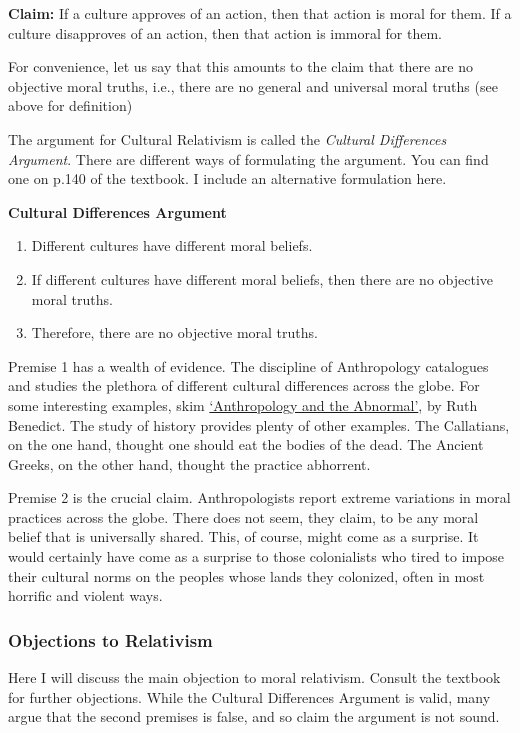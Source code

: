 \documentclass[9pt]{article}
\providecommand{\tightlist}{%
  \setlength{\itemsep}{0pt}\setlength{\parskip}{0pt}}
\begin{document}
\textbf{Claim:} If a culture approves of an action, then that action is
moral for them. If a culture disapproves of an action, then that action
is immoral for them.

For convenience, let us say that this amounts to the claim that there
are no objective moral truths, i.e., there are no general and universal
moral truths (see above for definition)

The argument for Cultural Relativism is called the \emph{Cultural
Differences Argument}. There are different ways of formulating the
argument. You can find one on p.140 of the textbook. I include an
alternative formulation here.

\textbf{Cultural Differences Argument}

\begin{enumerate}
\def\labelenumi{\arabic{enumi}.}
\tightlist
\item
  Different cultures have different moral beliefs.
\item
  If different cultures have different moral beliefs, then there are no
  objective moral truths.
\item
  Therefore, there are no objective moral truths.
\end{enumerate}

Premise 1 has a wealth of evidence. The discipline of Anthropology
catalogues and studies the plethora of different cultural differences
across the globe. For some interesting examples, skim
\href{Benedict.pdf}{`Anthropology and the Abnormal'}, by Ruth Benedict.
The study of history provides plenty of other examples. The Callatians,
on the one hand, thought one should eat the bodies of the dead. The
Ancient Greeks, on the other hand, thought the practice abhorrent.

Premise 2 is the crucial claim. Anthropologists report extreme
variations in moral practices across the globe. There does not seem,
they claim, to be any moral belief that is universally shared. This, of
course, might come as a surprise. It would certainly have come as a
surprise to those colonialists who tired to impose their cultural norms
on the peoples whose lands they colonized, often in most horrific and
violent ways.

\subsubsection{Objections to Relativism}\label{objections-to-relativism}

Here I will discuss the main objection to moral relativism. Consult the
textbook for further objections. While the Cultural Differences Argument
is valid, many argue that the second premises is false, and so claim the
argument is not sound.
\end{document}
